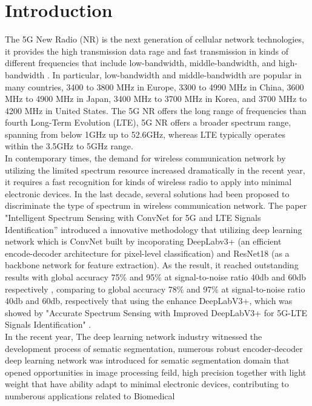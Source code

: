 \documentclass[journal]{IEEEtran} %
\begin{document}
\section{Introduction}
The 5G New Radio (NR) is the next generation of cellular network technologies, it provides the high transmission data rage and fast transmission in kinds of different frequencies that include low-bandwidth, middle-bandwidth, and high-bandwidth \cite{b7}. In particular, low-bandwidth and middle-bandwidth are popular in many countries, 3400 to 3800 MHz in Europe, 3300 to 4990 MHz in China, 3600 MHz to 4900 MHz in Japan, 3400 MHz to 3700 MHz in Korea, and 3700 MHz to 4200 MHz in United States. The 5G NR offers the long range of frequencies than fourth Long-Term Evolution (LTE), 5G NR offers a broader spectrum range, spanning from below 1GHz up to 52.6GHz, whereas LTE typically operates within the 3.5GHz to 5GHz range.
\\
\indent
In contemporary times, the demand for wireless communication network by utilizing the limited spectrum resource increased dramatically in the recent year, it requires a fast recognition for kinds of wireless radio to apply into minimal electronic devices. In the last decade, several solutions had been proposed to discriminate the type of spectrum in wireless communication network. The paper "Intelligent Spectrum Sensing with ConvNet for 5G and LTE Signals Identification”\cite{b1} introduced a innovative methodology that utilizing deep learning network which is ConvNet built by incoporating DeepLabv3+ (an efficient encode-decoder architecture for pixel-level classification) and ResNet18 (as a backbone network for feature extraction). As the result, it reached outstanding results with global accuracy 75\% and 95\% at signal-to-noise ratio 40db and 60db respectively \cite{b1}, comparing to global accuracy 78\% and 97\% at signal-to-noise ratio 40db and 60db, respectively that using the enhance DeepLabV3+, which was showed by "Accurate Spectrum Sensing with Improved DeepLabV3+ for 5G-LTE Signals Identification" \cite{b2}.
\\
\indent
In the recent year, The deep learning network industry witnessed the development process of sematic segmentation, numerous robust encoder-decoder deep learning network was introduced for sematic segmentation domain that opened opportunities in image processing feild, high precision together with light weight that have ability adapt to minimal electronic devices, contributing to numberous applications related to Biomedical
\end{document}
